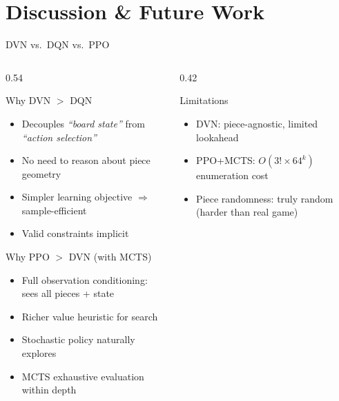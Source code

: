 \documentclass[aspectratio=169,10pt]{beamer}
\begin{document}
\section{Discussion \& Future Work}

\begin{frame}{DVN vs.\ DQN vs.\ PPO}
\begin{columns}[T]
\begin{column}{0.54\textwidth}
\begin{exampleblock}{Why DVN $>$ DQN}
\begin{itemize}
    \item Decouples \emph{``board state''} from \emph{``action selection''}
    \item No need to reason about piece geometry
    \item Simpler learning objective $\Rightarrow$ sample-efficient
    \item Valid constraints implicit
\end{itemize}
\end{exampleblock}

\vspace{0.3em}
\begin{exampleblock}{Why PPO $>$ DVN (with MCTS)}
\begin{itemize}
    \item Full observation conditioning: sees all pieces + state
    \item Richer value heuristic for search
    \item Stochastic policy naturally explores
    \item MCTS exhaustive evaluation within depth
\end{itemize}
\end{exampleblock}
\end{column}

\begin{column}{0.42\textwidth}
\begin{alertblock}{Limitations}
\begin{itemize}
    \item DVN: piece-agnostic, limited lookahead
    \item PPO+MCTS: $O(3! \times 64^k)$ enumeration cost
    \item Piece randomness: truly random (harder than real game)
\end{itemize}
\end{alertblock}
\end{column}
\end{columns}
\end{frame}
\end{document}
